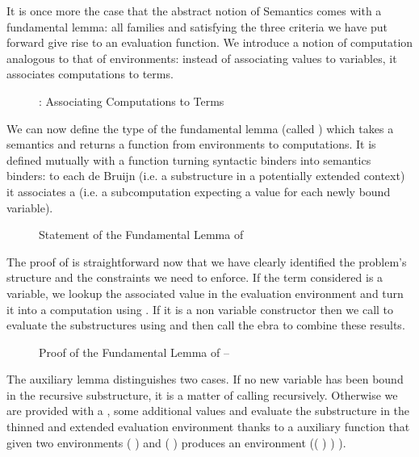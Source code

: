 
It is once more the case that the abstract notion of Semantics comes with
a fundamental lemma: all   families  and 
satisfying the three criteria we have put forward give rise to an evaluation
function. We introduce a notion of computation  analogous to
that of environments: instead of associating values to variables, it
associates computations to terms.

\begin{figure}[h]
\caption{: Associating Computations to Terms}
\end{figure}

We can now define the type of the fundamental lemma (called ) which
takes a semantics and returns a function from environments to computations. It is
defined mutually with a function  turning syntactic binders into
semantics binders: to each de Bruijn  (i.e. a substructure in a potentially
extended context) it associates a  (i.e. a subcomputation expecting a
value for each newly bound variable).

\begin{figure}[h]
\caption{Statement of the Fundamental Lemma of \label{defn:semantics}}
\end{figure}

The proof of  is straightforward now that we have clearly identified the
problem's structure and the constraints we need to enforce. If the term considered
is a variable, we lookup the associated value in the evaluation environment and
turn it into a computation using . If it is a non variable constructor
then we call  to evaluate the substructures using  and then
call the ebra to combine these results.

\begin{figure}[h]
\caption{Proof of the Fundamental Lemma of  -- }
\end{figure}

The auxiliary lemma  distinguishes two cases. If no new variable has
been bound in the recursive substructure, it is a matter of calling 
recursively. Otherwise we are provided with a , some additional
values and evaluate the substructure in the thinned and extended evaluation
environment thanks to a auxiliary function 
that given two environments
{( )  } and {( )  }
produces an environment {(( \AF{++} ) )  )}.

